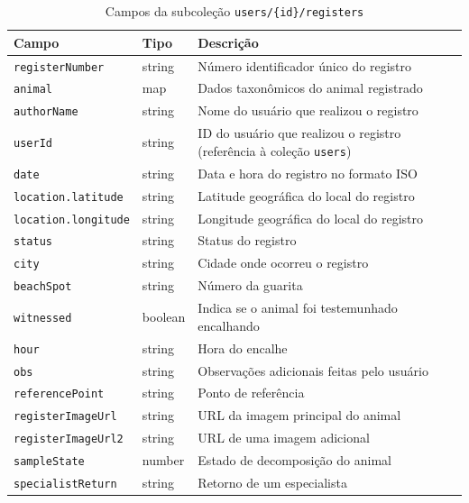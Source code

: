 \begin{table}[H]
    \centering
    \caption{Campos da subcoleção \texttt{users/\{id\}/registers}}
    \label{tab:subcolecao-registers}
    \begin{tabular}{|p{4cm}|p{2cm}|p{7cm}|}
        \hline
        \textbf{Campo} & \textbf{Tipo} & \textbf{Descrição} \\ \hline
        \texttt{registerNumber} & string & Número identificador único do registro \\ \hline
        \texttt{animal} & map & Dados taxonômicos do animal registrado \\ \hline
        \texttt{authorName} & string & Nome do usuário que realizou o registro \\ \hline
        \texttt{userId} & string & ID do usuário que realizou o registro (referência à coleção \texttt{users}) \\ \hline
        \texttt{date} & string & Data e hora do registro no formato ISO \\ \hline
        \texttt{location.latitude} & string & Latitude geográfica do local do registro \\ \hline
        \texttt{location.longitude} & string & Longitude geográfica do local do registro \\ \hline
        \texttt{status} & string & Status do registro \\ \hline
        \texttt{city} & string & Cidade onde ocorreu o registro \\ \hline
        \texttt{beachSpot} & string & Número da guarita \\ \hline
        \texttt{witnessed} & boolean & Indica se o animal foi testemunhado encalhando \\ \hline
        \texttt{hour} & string & Hora do encalhe \\ \hline
        \texttt{obs} & string & Observações adicionais feitas pelo usuário \\ \hline
        \texttt{referencePoint} & string & Ponto de referência \\ \hline
        \texttt{registerImageUrl} & string & URL da imagem principal do animal \\ \hline
        \texttt{registerImageUrl2} & string & URL de uma imagem adicional \\ \hline
        \texttt{sampleState} & number & Estado de decomposição do animal \\ \hline
        \texttt{specialistReturn} & string & Retorno de um especialista \\ \hline
    \end{tabular}
\end{table}

